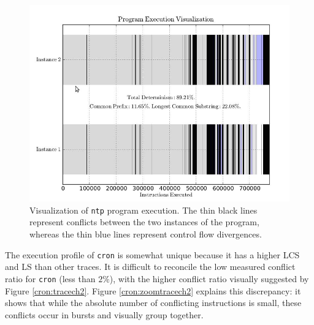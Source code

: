 \begin{figure}[h]
  \center
  \includegraphics[trim=0cm 0cm 0cm 0cm, scale=0.5]{ntptracech2.jpg}
  \caption[Visualization of \texttt{ntp} program execution]%
          {Visualization of \texttt{ntp} program execution.
          The thin black lines represent conflicts between
          the two instances of the program, whereas
          the thin blue lines represent control flow
          divergences.}
  \label{ntp:tracech2}
\end{figure} 

The execution profile of \texttt{cron} is somewhat unique
because it has a higher LCS and LS than other traces. It is
difficult to reconcile the low measured conflict ratio for \texttt{cron} (less
than $2\%$), with the higher conflict ratio visually suggested by 
Figure \ref{cron:tracech2}. Figure \ref{cron:zoomtracech2} 
explains this discrepancy: it shows that while
the absolute number of conflicting instructions is small,
these conflicts occur in bursts and visually group together. 

